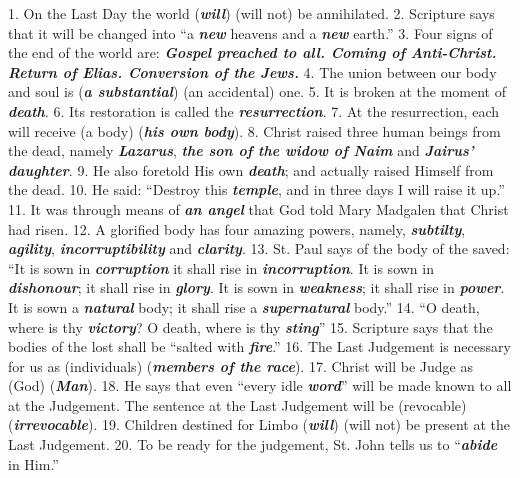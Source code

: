 \documentclass[a4paper,14pt]{memoir}
\newcommand\answer[1]{\textbf{\textit{#1}}}
\newcounter{z}
\begin{document}
1. On the Last Day the world (\answer{will}) (will not) be annihilated. 
2.  Scripture
says that it will be changed into “a \answer{new} heavens and a \answer{new} earth.”  
3.
Four signs of the end of the world are: \answer{Gospel preached to all. Coming of Anti-Christ. Return of Elias. Conversion of the Jews.}
4.
The union between our body and soul is (\answer{a substantial}) (an accidental)  one.
5. It is broken at the moment of \answer{death}. 
6. Its restoration  is  called  the
\answer{resurrection}. 
7. At the resurrection, each will receive (a body) (\answer{his  own  body}).
8. Christ raised three human beings from the  dead,  namely  \answer{Lazarus},  \answer{the son of the widow of Naim}
and \answer{Jairus' daughter}. 
9. He also foretold His own \answer{death}; and actually raised  Himself
from the dead. 
10. He said: “Destroy this \answer{temple}, and in three days  I  will
raise it up.” 
11. It  was  through  means  of  \answer{an angel}  that  God  told  Mary
Madgalen that Christ had risen.  
12.  A  glorified  body  has  four  amazing
powers, namely, \answer{subtilty}, \answer{agility}, \answer{incorruptibility} and \answer{clarity}. 
13. St. Paul says of  the
body of the saved: “It is sown in \answer{corruption} it shall  rise  in  \answer{incorruption}.  It  is
sown in \answer{dishonour}; it shall rise in \answer{glory}. It is  sown  in  \answer{weakness};  it  shall
rise in \answer{power}. It is sown a \answer{natural} body; it shall rise a \answer{supernatural} body.”  
14.
“O death, where is thy \answer{victory}? O death, where is thy \answer{sting}”  
15.  Scripture
says that the bodies of the lost shall be  “salted  with  \answer{fire}.”  
16.  The
Last Judgement is necessary for us as (individuals) (\answer{members of  the  race}).
17. Christ will be Judge as (God) (\answer{Man}). 
18. He says that even  ``every  idle
\answer{word}'' will be made known to all at the  Judgement.  The  sentence  at  the
Last Judgement will be (revocable) (\answer{irrevocable}). 
19. Children destined  for
Limbo (\answer{will}) (will not) be present at the Last Judgement.
20.  To  be  ready
for the judgement, St. John tells us to “\answer{abide} in Him.”
\end{document}
